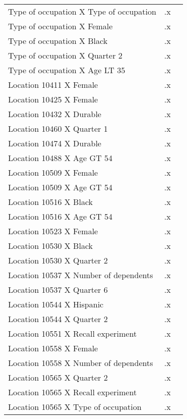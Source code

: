 \begin{tabular}{l*{2}{c}}
Type of occupation X Type of occupation&          .x&            \\
Type of occupation X Female&          .x&            \\
Type of occupation X Black&          .x&            \\
Type of occupation X Quarter 2&          .x&            \\
Type of occupation X Age LT 35&          .x&            \\
Location 10411 X Female&          .x&            \\
Location 10425 X Female&          .x&            \\
Location 10432 X Durable&          .x&            \\
Location 10460 X Quarter 1&          .x&            \\
Location 10474 X Durable&          .x&            \\
Location 10488 X Age GT 54&          .x&            \\
Location 10509 X Female&          .x&            \\
Location 10509 X Age GT 54&          .x&            \\
Location 10516 X Black&          .x&            \\
Location 10516 X Age GT 54&          .x&            \\
Location 10523 X Female&          .x&            \\
Location 10530 X Black&          .x&            \\
Location 10530 X Quarter 2&          .x&            \\
Location 10537 X Number of dependents&          .x&            \\
Location 10537 X Quarter 6&          .x&            \\
Location 10544 X Hispanic&          .x&            \\
Location 10544 X Quarter 2&          .x&            \\
Location 10551 X Recall experiment&          .x&            \\
Location 10558 X Female&          .x&            \\
Location 10558 X Number of dependents&          .x&            \\
Location 10565 X Quarter 2&          .x&            \\
Location 10565 X Recall experiment&          .x&            \\
Location 10565 X Type of occupation&          .x&            \\

\end{tabular}
